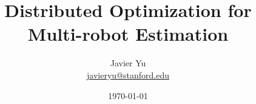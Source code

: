 \documentclass[pdf]{beamer}
\title{Distributed Optimization for Multi-robot Estimation}
\date{\today}
\author[Javier Yu]{\texorpdfstring{\Large Javier Yu \\ \footnotesize \href{javieryu@stanford.edu}{javieryu@stanford.edu}}{}}
\institute{Department of Aeronautics and Astronautics \\ Stanford University}
\begin{document}
\begin{noheadline}
\begin{frame} \maketitle \end{frame}
\end{noheadline}
\end{document}
